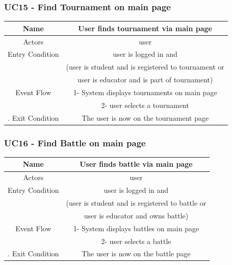 \documentclass{article}
\begin{document}
\subsubsection*{UC15 - Find Tournament on main page}

\begin{tabular*}{\linewidth}{@{\extracolsep{\fill}} cc }
    \hline
    Name & User finds tournament via main page\\ 
    \hline
    Actors & user\\ 
    \hline
    Entry Condition & user is logged in and\\
                    & (user is student and is registered to tournament or\\ 
                    & user is educator and is part of tournament)\\
    \hline
    Event Flow & 1- System displays tournaments on main page\\
               & 2- user selects a tournament\\
    \hline.
    Exit Condition & The user is now on the tournament page\\
                
    \hline
\end{tabular*}

\subsubsection*{UC16 - Find Battle on main page}

\begin{tabular*}{\linewidth}{@{\extracolsep{\fill}} cc }
    \hline
    Name & User finds battle via main page\\ 
    \hline
    Actors & user\\ 
    \hline
    Entry Condition & user is logged in and\\
                    & (user is student and is registered to battle or\\ 
                    & user is educator and owns battle)\\
    \hline
    Event Flow & 1- System displays battles on main page\\
               & 2- user selects a battle\\
    \hline.
    Exit Condition & The user is now on the battle page\\
                
    \hline
\end{tabular*}
\end{document}
